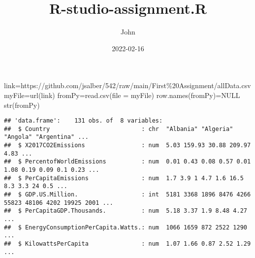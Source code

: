 \documentclass[
]{article}
\title{R-studio-assignment.R}
\author{John}
\date{2022-02-16}
\newenvironment{Shaded}{\begin{snugshade}}{\end{snugshade}}
\newcommand{\AttributeTok}[1]{\textcolor[rgb]{0.77,0.63,0.00}{#1}}
\newcommand{\ConstantTok}[1]{\textcolor[rgb]{0.00,0.00,0.00}{#1}}
\newcommand{\DecValTok}[1]{\textcolor[rgb]{0.00,0.00,0.81}{#1}}
\newcommand{\FunctionTok}[1]{\textcolor[rgb]{0.00,0.00,0.00}{#1}}
\newcommand{\NormalTok}[1]{#1}
\newcommand{\OtherTok}[1]{\textcolor[rgb]{0.56,0.35,0.01}{#1}}
\newcommand{\SpecialCharTok}[1]{\textcolor[rgb]{0.00,0.00,0.00}{#1}}
\newcommand{\StringTok}[1]{\textcolor[rgb]{0.31,0.60,0.02}{#1}}
\begin{document}
\maketitle

\begin{Shaded}
\begin{Highlighting}[]
\NormalTok{link}\OtherTok{=}\StringTok{\textquotesingle{}https://github.com/jsalber/542/raw/main/First\%20Assignment/allData.csv\textquotesingle{}}
\NormalTok{myFile}\OtherTok{=}\FunctionTok{url}\NormalTok{(link)}
\NormalTok{fromPy}\OtherTok{=}\FunctionTok{read.csv}\NormalTok{(}\AttributeTok{file =}\NormalTok{ myFile)}
\FunctionTok{row.names}\NormalTok{(fromPy)}\OtherTok{=}\ConstantTok{NULL}
\FunctionTok{str}\NormalTok{(fromPy)}
\end{Highlighting}
\end{Shaded}

\begin{verbatim}
## 'data.frame':    131 obs. of  8 variables:
##  $ Country                          : chr  "Albania" "Algeria" "Angola" "Argentina" ...
##  $ X2017CO2Emissions                : num  5.03 159.93 30.88 209.97 4.83 ...
##  $ PercentofWorldEmissions          : num  0.01 0.43 0.08 0.57 0.01 1.08 0.19 0.09 0.1 0.23 ...
##  $ PerCapitaEmissions               : num  1.7 3.9 1 4.7 1.6 16.5 8.3 3.3 24 0.5 ...
##  $ GDP.US.Million.                  : int  5181 3368 1896 8476 4266 55823 48106 4202 19925 2001 ...
##  $ PerCapitaGDP.Thousands.          : num  5.18 3.37 1.9 8.48 4.27 ...
##  $ EnergyConsumptionPerCapita.Watts.: num  1066 1659 872 2522 1290 ...
##  $ KilowattsPerCapita               : num  1.07 1.66 0.87 2.52 1.29 ...
\end{verbatim}

\begin{Shaded}
\end{Shaded}
\end{document}
